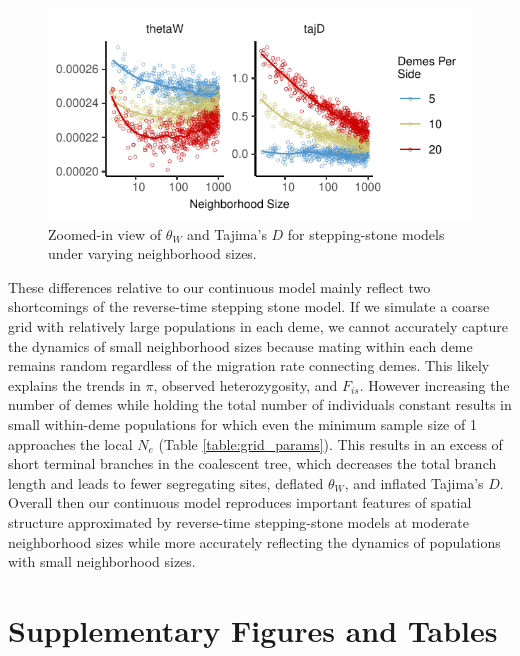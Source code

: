 \documentclass[10pt,twoside,lineno,hidelinks]{preprint}
\begin{document}
\begin{figure}[h]
\centering
\includegraphics[]{ms/figures/grid_thetaW_tajD_zoom.pdf}
\caption{Zoomed-in view of $\theta_{W}$ and Tajima's $D$ for stepping-stone models under varying neighborhood sizes.}
\label{fig:grid_stats_zoom}
\end{figure}

These differences relative to our continuous model mainly reflect two shortcomings of the reverse-time stepping stone model. If we simulate a coarse grid with relatively large populations in each deme, we cannot accurately capture the dynamics of small neighborhood sizes because mating within each deme remains random regardless of the migration rate connecting demes. This likely explains the trends in $\pi$, observed heterozygosity, and $F_{is}$. However increasing the number of demes while holding the total number of individuals constant results in small within-deme populations for which even the minimum sample size of 1 approaches the local $N_e$ (Table \ref{table:grid_params}). This results in an excess of short terminal branches in the coalescent tree, which decreases the total branch length and leads to fewer segregating sites, deflated $\theta_W$, and inflated Tajima's $D$. Overall then our continuous model reproduces important features of spatial structure approximated by reverse-time stepping-stone models at moderate neighborhood sizes while more accurately reflecting the dynamics of populations with small neighborhood sizes. 

\stopappendix
\clearpage 

\section{Supplementary Figures and Tables}
\beginsupplement
\end{document}
